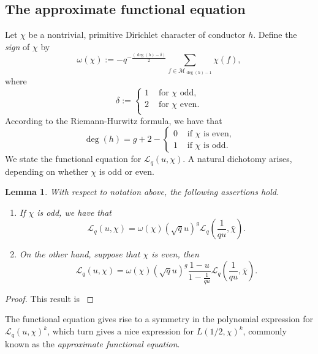 \documentclass[table]{amsart}
\newtheorem{lemma}[theorem]{Lemma}
\newcommand{\cL}{\mathcal{L}}
\newcommand{\op}[1]{\operatorname{#1}}
\numberwithin{equation}{section}
\begin{document}
\subsection{The approximate functional equation}
 Let $\chi$ be a nontrivial, primitive Dirichlet character of conductor $h$. Define the \emph{sign} of $\chi$ by
\[
\omega(\chi):= - q^{-\frac{(\op{deg}(h) -\delta)}{2}} \sum_{f \in \mathcal{M}_{\op{deg}(h) - 1}} \chi(f),
\]  
where \[\delta:=\begin{cases}
    1 & \text{ for }\chi \text{ odd},\\
    2 & \text{ for }\chi\text{ even}.\\
\end{cases}\]
According to the Riemann-Hurwitz formula, we have that
\begin{equation}\label{RH formula}
\op{deg}(h)=g+2- \begin{cases}0 & \text { if } \chi \text { is even,}\\ 1 & \text { if } \chi \text { is odd.}\end{cases}
\end{equation}
\noindent We state the functional equation for $\mathcal{L}_{q}(u, \chi)$. A natural dichotomy arises, depending on whether $\chi$ is odd or even.
\begin{lemma} \label{functional equation lemma}
With respect to notation above, the following assertions hold.
\begin{enumerate}
    \item If $\chi$ is odd, we have that
    \begin{equation}\label{FE odd case}
\mathcal{L}_{q}(u, \chi) = \omega(\chi) (\sqrt{q} u)^{g} \mathcal{L}_{q} \left(\frac{1}{q u}, \bar{\chi} \right).
\end{equation}
\item On the other hand, suppose that $\chi$ is even, then 
\begin{equation}\label{FE even case}
\mathcal{L}_{q}(u, \chi) = \omega(\chi) (\sqrt{q} u)^{g} \frac{1 - u}{1 - \frac{1}{q u}} \mathcal{L}_{q} \left(\frac{1}{q u}, \bar{\chi} \right).
\end{equation}
\end{enumerate}
\end{lemma}

\begin{proof}
    This result is \cite[Lemma 2.3]{DFLCubic}
\end{proof}

\noindent The functional equation gives rise to a symmetry in the polynomial expression for $\cL_q(u, \chi)^k$, which turn gives a nice expression for $L(1/2, \chi)^k$, commonly known as the \emph{approximate functional equation}.
\end{document}
